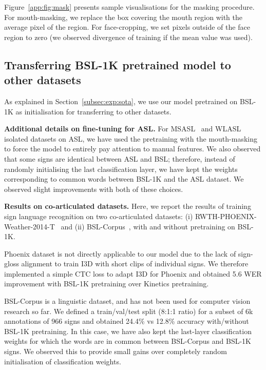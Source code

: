 Figure~\ref{app:fig:mask} presents sample
visualisations for the masking procedure.
For mouth-masking, we replace the box covering the mouth region
with the average pixel of the region. For face-cropping,
we set pixels outside of the face region to zero
(we observed divergence of training if the mean value
was used).

\subsection{Transferring BSL-1K pretrained model to other datasets}\label{app:subsec:transfer}
As explained in
Section~\ref{subsec:exp:sota},
we use our model pretrained on BSL-1K as initialisation for transferring
to other datasets.

\noindent\textbf{Additional details on fine-tuning for ASL.}
For MSASL~\cite{Joze19msasl} and WLASL~\cite{Li19wlasl}
isolated datasets on ASL, we have used the pretraining with the
mouth-masking to force the model to entirely pay attention to manual features.
We also observed that some signs are identical between ASL and BSL; therefore,
instead of randomly initialising the last classification layer, we have kept
the weights corresponding to common words between BSL-1K and the ASL dataset.
We observed slight improvements with both of these choices.

\noindent\textbf{Results on co-articulated datasets.}
Here, we report the results
of training sign language recognition on two co-articulated datasets: (i) RWTH-PHOENIX-Weather-2014-T~\cite{Koller15cslr,Camgoz18}
and (ii) BSL-Corpus~\cite{bslcorpus17,schembri2013building}, with and without
pretraining on BSL-1K.

Phoenix dataset is not directly applicable to our model due to the lack of sign-gloss
alignment to train I3D with short clips of individual signs. We therefore
implemented a simple CTC loss \cite{graves2006ctc} to adapt I3D for Phoenix
and obtained 5.6 WER improvement with BSL-1K pretraining over Kinetics pretraining.

BSL-Corpus is a linguistic dataset, and has not been used for computer vision research so far. We defined a train/val/test split (8:1:1 ratio) for a subset of 6k annotations of 966 signs and obtained 24.4\% vs 12.8\% accuracy with/without BSL-1K pretraining. In this case, we have also kept the last-layer classification weights for which the words are in common between BSL-Corpus and BSL-1K signs. We observed this to provide small gains over completely random initialisation of classification weights.

